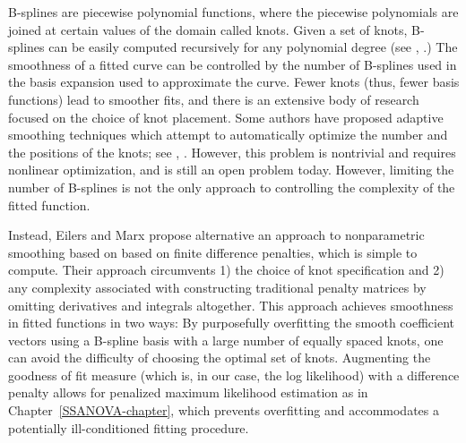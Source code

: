 B-splines are piecewise polynomial functions, where the piecewise polynomials are joined at certain values of the domain called knots. Given a set of knots, B-splines can be easily computed recursively for any polynomial degree (see \cite{de1978practical}, \cite{dierckx1995curve}.) The smoothness of a fitted curve can be controlled by the number of B-splines used in the basis expansion used to approximate the curve. Fewer knots (thus, fewer basis functions) lead to smoother fits, and there is an extensive body of research focused on the choice of knot placement. Some authors have proposed adaptive smoothing techniques which attempt to automatically optimize the number and the positions of the knots; see \cite{friedman1989flexible}, \cite{kooperberg1991study}. However, this problem is nontrivial and requires nonlinear optimization, and is still an open problem today. However, limiting the number of B-splines is not the only approach to controlling the complexity of the fitted function.

\bigskip

Instead, Eilers and Marx propose alternative an approach to nonparametric smoothing based on based on finite difference penalties, which is simple to compute. Their approach circumvents 1) the choice of knot specification and 2) any complexity associated with constructing traditional penalty matrices by omitting derivatives and integrals altogether.  This approach achieves smoothness in fitted functions in two ways: By purposefully overfitting the smooth coefficient vectors using a B-spline basis with a large number of equally spaced knots, one can avoid the difficulty of choosing the optimal set of knots.  Augmenting the goodness of fit measure (which is, in our case, the log likelihood) with a difference penalty allows for penalized maximum likelihood estimation as in Chapter~\ref{SSANOVA-chapter}, which prevents overfitting and accommodates a potentially ill-conditioned fitting procedure. 

\bigskip

